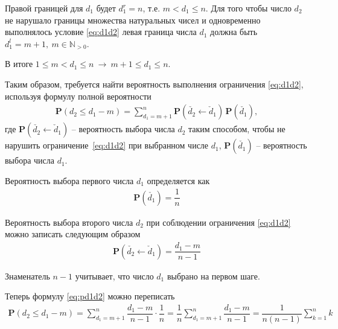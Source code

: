 \documentclass[%
	11pt,
	a4paper,
	utf8,
		]{article}
\begin{document}
Правой границей для $ d_1 $ будет $ d_1^r = n $, т.е. $ m < d_1 \leqslant n $. Для того чтобы число $ d_2 $ не нарушало границы множества натуральных чисел и одновременно выполнялось условие \eqref{eq:d1d2} левая граница числа $ d_1 $ должна быть $ d_1^l = m + 1, \ m \in \mathbb{N}_{> 0} $.

В итоге $ 1 \leqslant m < d_1 \leqslant n \ \rightarrow \ m + 1 \leqslant d_1 \leqslant n $.

Таким образом, требуется найти вероятность выполнения ограничения \eqref{eq:d1d2}, используя формулу полной вероятности
\begin{align}\label{eq:pd1d2}
	\mathbf{P}(d_2 \leqslant d_1 - m) = \sum_{d_1 = m + 1}^{n} \mathbf{P}(\check{d_2} \leftarrow \check{d}_1) \, \mathbf{P}(\check{d_1}),
\end{align}
где $ \mathbf{P}(\check{d_2} \leftarrow \check{d}_1) $ -- вероятность выбора числа $ d_2 $ таким способом, чтобы не нарушить ограничение~\eqref{eq:d1d2} при выбранном числе $ d_1 $, $ \mathbf{P}(\check{d_1}) $ -- вероятность выбора числа $ d_1 $.

Вероятность выбора первого числа $ d_1 $ определяется как
\begin{align*}
	\mathbf{P}(\check{d_1}) = \dfrac{1}{n}
\end{align*}


Вероятность выбора второго числа $ d_2 $ при соблюдении ограничения \eqref{eq:d1d2} можно записать следующим образом
\begin{align*}
	\mathbf{P}(\check{d_2} \leftarrow \check{d}_1) = \dfrac{d_1 - m}{n - 1}
\end{align*}

Знаменатель $ n - 1 $ учитывает, что число $ d_1 $ выбрано на первом шаге.

Теперь формулу \eqref{eq:pd1d2} можно переписать
\begin{align*}
	\mathbf{P}(d_2 \leqslant d_1 - m) = \sum_{d_1 = m + 1}^n \dfrac{d_1 - m}{n - 1} \cdot \dfrac{1}{n} = \dfrac{1}{n} \sum_{d_1 = m + 1}^n \dfrac{d_1 - m}{n - 1} = \dfrac{1}{n (n-1)} \sum_{k=1}^n k 
\end{align*}
\end{document}
